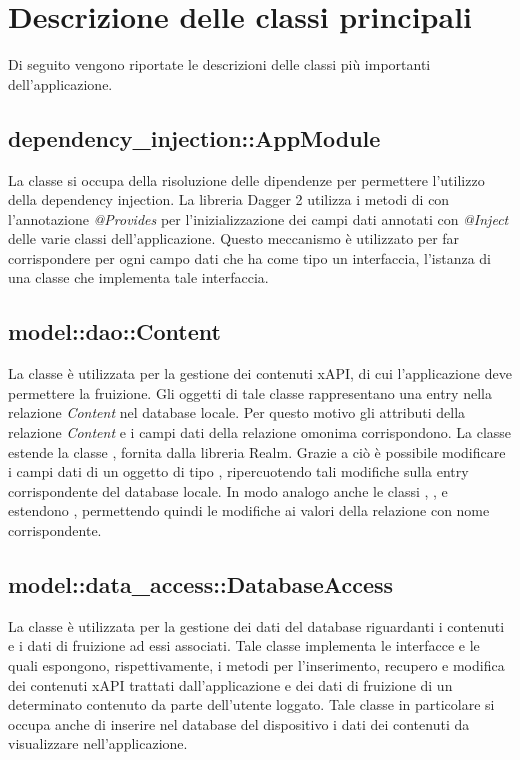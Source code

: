 \documentclass[../Tesi.tex]{subfiles}
\begin{document}
	\section{Descrizione delle classi principali}
	Di seguito vengono riportate le descrizioni delle classi più importanti dell'applicazione.

		\subsection{dependency\_injection::AppModule}
		La classe  si occupa della risoluzione delle dipendenze per permettere l'utilizzo della dependency injection. La libreria Dagger 2 utilizza i metodi di  con l'annotazione \textit{@Provides} per l'inizializzazione dei campi dati annotati con \textit{@Inject} delle varie classi dell'applicazione. Questo meccanismo è utilizzato per far corrispondere per ogni campo dati che ha come tipo un interfaccia, l'istanza di una classe che implementa tale interfaccia.

		\subsection{model::dao::Content}
		La classe  è utilizzata per la gestione dei contenuti xAPI, di cui l'applicazione deve permettere la fruizione. Gli oggetti di tale classe rappresentano una entry nella relazione \textit{Content} nel database locale. Per questo motivo gli attributi della relazione \textit{Content} e i campi dati della relazione omonima corrispondono. La classe  estende la classe , fornita dalla libreria Realm. Grazie a ciò è possibile modificare i campi dati di un oggetto di tipo , ripercuotendo tali modifiche sulla entry corrispondente del database locale. In modo analogo anche le classi , ,  e  estendono , permettendo quindi le modifiche ai valori della relazione con nome corrispondente.

		\subsection{model::data\_access::DatabaseAccess}
		La classe  è utilizzata per la gestione dei dati del database riguardanti i contenuti e i dati di fruizione ad essi associati. Tale classe implementa le interfacce  e  le quali espongono, rispettivamente, i metodi per l'inserimento, recupero e modifica dei contenuti xAPI trattati dall'applicazione e dei dati di fruizione di un determinato contenuto da parte dell'utente loggato. Tale classe in particolare si occupa anche di inserire nel database del dispositivo i dati dei contenuti da visualizzare nell'applicazione.
\end{document}
